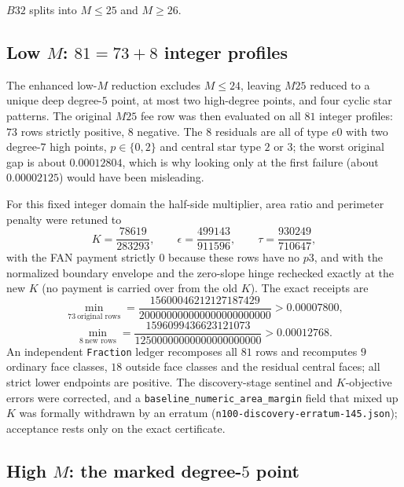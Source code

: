 $B32$ splits into $M\le25$ and $M\ge26$.

\subsection{Low $M$: $81=73+8$ integer profiles}

The enhanced low-$M$ reduction excludes $M\le24$, leaving $M25$ reduced to a unique deep degree-$5$
point, at most two high-degree points, and four cyclic star patterns. The original $M25$ fee row was
then evaluated on all $81$ integer profiles: $73$ rows strictly positive, $8$ negative. The $8$
residuals are all of type $e0$ with two degree-$7$ high points, $p\in\{0,2\}$ and central star type
$2$ or $3$; the worst original gap is about $0.00012804$, which is why looking only at the first
failure (about $0.00002125$) would have been misleading.

For this fixed integer domain the half-side multiplier, area ratio and perimeter penalty were
retuned to
\[
K=\frac{78619}{283293},\qquad \epsilon=\frac{499143}{911596},\qquad
\tau=\frac{930249}{710647},
\]
with the FAN payment strictly $0$ because these rows have no $p3$, and with the normalized boundary
envelope and the zero-slope hinge rechecked exactly at the new $K$ (no payment is carried over from
the old $K$). The exact receipts are
\[
\min_{73\ \text{original rows}}=\frac{15600046212127187429}{200000000000000000000000}>0.00007800,
\]
\[
\min_{8\ \text{new rows}}=\frac{1596099436623121073}{12500000000000000000000}>0.00012768 .
\]
An independent \texttt{Fraction} ledger recomposes all $81$ rows and recomputes $9$ ordinary face
classes, $18$ outside face classes and the residual central faces; all strict lower endpoints are
positive. The discovery-stage sentinel and $K$-objective errors were corrected, and a
\texttt{baseline\_\allowbreak{}numeric\_\allowbreak{}area\_\allowbreak{}margin} field that mixed up $K$ was formally withdrawn by an
erratum (\texttt{n100-\allowbreak{}discovery-\allowbreak{}erratum-\allowbreak{}145.json}); acceptance rests only on the exact certificate.

\subsection{High $M$: the marked degree-$5$ point}

